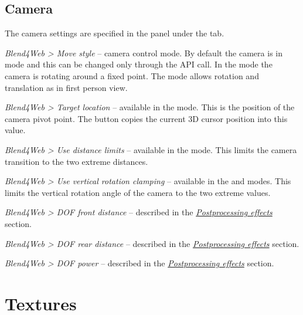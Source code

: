 \documentclass[a4paper,12pt,oneside]{sphinxmanual}
\begin{document}
\section{Camera}
\label{objects:id4}
The camera settings are specified in the  panel under the  tab.

\emph{Blend4Web \textgreater{} Move style} -- camera control mode. By default the camera is in  mode and this can be changed only through the API call. In the  mode the camera is rotating around a fixed point. The  mode allows rotation and translation as in first person view.

\emph{Blend4Web \textgreater{} Target location} -- available in the  mode. This is the position of the camera pivot point. The  button copies the current 3D cursor position into this value.

\emph{Blend4Web \textgreater{} Use distance limits} -- available in the  mode. This limits the camera transition to the two extreme distances.

\emph{Blend4Web \textgreater{} Use vertical rotation clamping} -- available in the  and  modes. This limits the vertical rotation angle of the camera to the two extreme values.

\emph{Blend4Web \textgreater{} DOF front distance} -- described in the {\hyperref[postprocessing_effects:postprocessing-effects]{\emph{Postprocessing effects}}} section.

\emph{Blend4Web \textgreater{} DOF rear distance} -- described in the {\hyperref[postprocessing_effects:postprocessing-effects]{\emph{Postprocessing effects}}} section.

\emph{Blend4Web \textgreater{} DOF power} -- described in the {\hyperref[postprocessing_effects:postprocessing-effects]{\emph{Postprocessing effects}}} section.
\label{textures:textures}

\chapter{Textures}
\label{textures:index-0}\label{textures::doc}\label{textures:id1}
\end{document}
